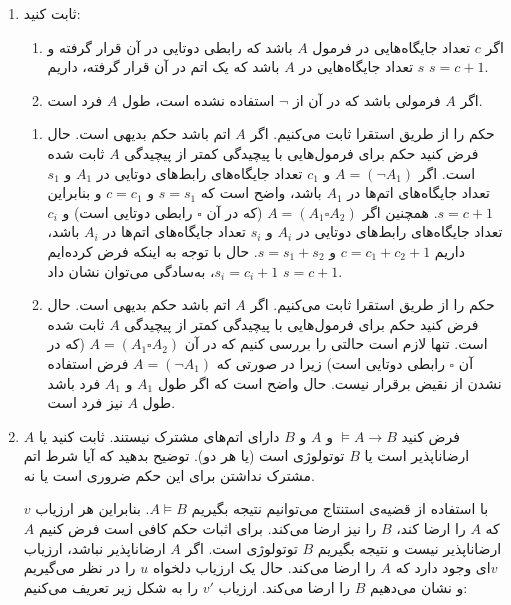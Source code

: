 \documentclass[12pt, 14paper]{article}
\begin{document}
\begin{enumerate}
\item
ثابت کنید:
\begin{enumerate}
\item
اگر $c$ تعداد جایگاه‌هایی در فرمول $A$ باشد که رابطی دوتایی در آن قرار گرفته و $s$ تعداد جایگاه‌هایی در $A$ باشد که یک اتم در آن قرار گرفته، داریم $s=c+1$.
\item
اگر $A$ فرمولی باشد که در آن از $\neg$ استفاده نشده است، طول $A$ فرد است.
\end{enumerate}
\quad
\begin{ans}
  \begin{enumerate}
    \item
    حکم را از طریق استقرا ثابت می‌کنیم. اگر $A$ اتم باشد حکم بدیهی است. حال فرض کنید حکم برای فرمول‌هایی با پیچیدگی کمتر از پیچیدگی $A$ ثابت شده است. اگر $A=(\neg A_1)$ و $c_1$ تعداد جایگاه‌های رابط‌های دوتایی در $A_1$ و $s_1$ تعداد جایگاه‌های اتم‌ها در $A_1$ باشد، واضح است که $s=s_1$ و $c=c_1$ و بنابراین $s=c+1$. همچنین اگر $A=(A_1\square A_2)$ (که در آن $\square$ رابطی دوتایی است) و $c_i$ تعداد جایگاه‌های رابط‌های دوتایی در $A_i$ و $s_i$ تعداد جایگاه‌های اتم‌ها در $A_i$ باشد، داریم $c=c_1+c_2+1$ و $s=s_1+s_2$. حال با توجه به اینکه فرض کرده‌ایم $s_i=c_i+1$، به‌سادگی می‌توان نشان داد $s=c+1$.
    
    
    \item
    حکم را از طریق استقرا ثابت می‌کنیم. اگر $A$ اتم باشد حکم بدیهی است. حال فرض کنید حکم برای فرمول‌هایی با پیچیدگی کمتر از پیچیدگی $A$ ثابت شده است. تنها لازم است حالتی را بررسی کنیم که در آن $A=(A_1\square A_2)$ (که در آن $\square$ رابطی دوتایی است) زیرا در صورتی که $A=(\neg A_1)$ فرض استفاده نشدن از نقیض برقرار نیست. حال واضح است که اگر طول $A_1$ و $A_1$ فرد باشد طول $A$ نیز فرد است.
    
  \end{enumerate}
\end{ans}

\item
فرض کنید $\models A\rightarrow B$ و $A$ و $B$ دارای اتم‌های مشترک نیستند. ثابت کنید یا $A$ ارضاناپذیر است یا $B$ توتولوژی است (یا هر دو). توضیح بدهید که آیا شرط اتم مشترک نداشتن برای این حکم ضروری است یا نه.
\begin{ans}
  با استفاده از قضیه‌ی استنتاج می‌توانیم نتیجه بگیریم $A\models B$. بنابراین هر ارزیاب $v$ که $A$ را ارضا کند، $B$ را نیز ارضا می‌کند. برای اثبات حکم کافی است فرض کنیم $A$ ارضاناپذیر نیست و نتیجه بگیریم $B$ توتولوژی است. اگر $A$ ارضاناپذیر نباشد، ارزیاب $v$ای وجود دارد که $A$ را ارضا می‌کند. حال یک ارزیاب دلخواه $u$ را در نظر می‌گیریم و نشان می‌دهیم $B$ را ارضا می‌کند. ارزیاب $v'$ را به شکل زیر تعریف می‌کنیم:


\end{ans}
\end{enumerate}
\end{document}
